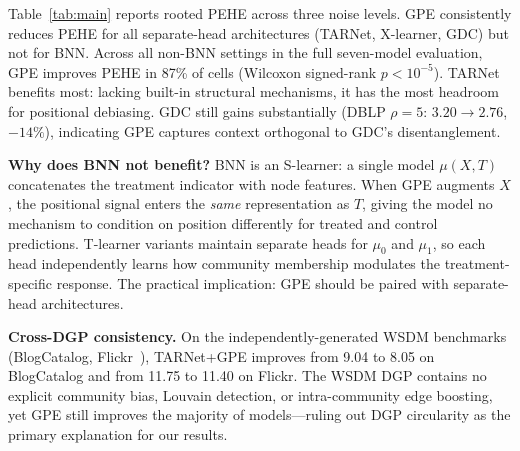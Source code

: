 \documentclass[sigconf,anonymous,review]{acmart}
\begin{document}
Table~\ref{tab:main} reports rooted PEHE across three noise levels. GPE consistently reduces PEHE for all separate-head architectures (TARNet, X-learner, GDC) but not for BNN. Across all non-BNN settings in the full seven-model evaluation, GPE improves PEHE in 87\% of cells (Wilcoxon signed-rank $p < 10^{-5}$). TARNet benefits most: lacking built-in structural mechanisms, it has the most headroom for positional debiasing. GDC still gains substantially (DBLP $\rho{=}5$: $3.20 \to 2.76$, $-14\%$), indicating GPE captures context orthogonal to GDC's disentanglement.

\textbf{Why does BNN not benefit?} BNN is an S-learner: a single model $\mu(X,T)$ concatenates the treatment indicator with node features. When GPE augments $X$, the positional signal enters the \emph{same} representation as $T$, giving the model no mechanism to condition on position differently for treated and control predictions. T-learner variants maintain separate heads for $\mu_0$ and $\mu_1$, so each head independently learns how community membership modulates the treatment-specific response. The practical implication: GPE should be paired with separate-head architectures.

\textbf{Cross-DGP consistency.} On the independently-generated WSDM benchmarks (BlogCatalog, Flickr~\cite{guo2020learning}), TARNet+GPE improves from 9.04 to 8.05 on BlogCatalog and from 11.75 to 11.40 on Flickr. The WSDM DGP contains no explicit community bias, Louvain detection, or intra-community edge boosting, yet GPE still improves the majority of models---ruling out DGP circularity as the primary explanation for our results.
\end{document}
